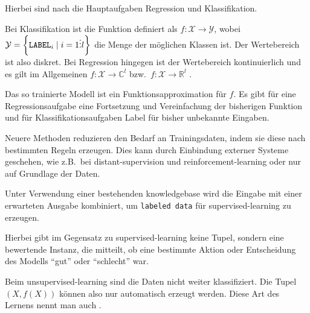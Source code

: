 Hierbei sind nach \citeauthor{levity:howdomachineslearn}
die Hauptaufgaben Regression und Klassifikation.

Bei Klassifikation ist die Funktion definiert als
\(f: \mathcal{X} \to \mathcal{Y}  \),
wobei \(\mathcal{Y} = \left\lbrace \text{\texttt{LABEL}}_i \mid i=1 \vdots l \right\rbrace \)
die Menge der möglichen Klassen ist.
Der Wertebereich ist also diskret.\autocite{ledu:regression-versus-classification}
Bei Regression hingegen ist der Wertebereich kontinuierlich
und es gilt im Allgemeinen \(f: \mathcal{X} \to \mathbb{C}^{l}\)
bzw.\, \(f: \mathcal{X} \to \mathbb{R}^{l}\) .

Das so trainierte Modell ist ein Funktionsapproximation für \(f\).
Es gibt für eine Regressionsaufgabe eine Fortsetzung und Vereinfachung der bisherigen Funktion
und für Klassifikationsaufgaben Label für bisher unbekannte Eingaben.

Neuere Methoden reduzieren den Bedarf an Trainingsdaten,
indem sie diese nach bestimmten Regeln erzeugen.
Dies kann durch Einbindung externer Systeme geschehen,
wie z.B.\, bei \gls{distant-supervision} und \gls{reinforcement-learning}
oder nur auf Grundlage der Daten.

\begin{defn}
	Unter Verwendung einer bestehenden \gls{knowledgebase}
	wird die Eingabe mit einer erwarteten Ausgabe kombiniert,
	um \texttt{labeled data} für \gls{supervised-learning} zu erzeugen.
\end{defn}

\begin{defn}
	Hierbei gibt im Gegensatz zu \gls{supervised-learning} keine Tupel,
	sondern eine bewertende Instanz,
	die mitteilt,
	ob eine bestimmte Aktion oder Entscheidung des Modells
	\enquote{gut} oder \enquote{schlecht} war.
\end{defn}

\begin{defn}
	Beim \gls{unsupervised-learning} sind die Daten nicht weiter klassifiziert.
	Die Tupel \(\left(X, f(X)\right)\) können also nur automatisch erzeugt werden.
	Diese Art des Lernens nennt man auch .
\end{defn}

